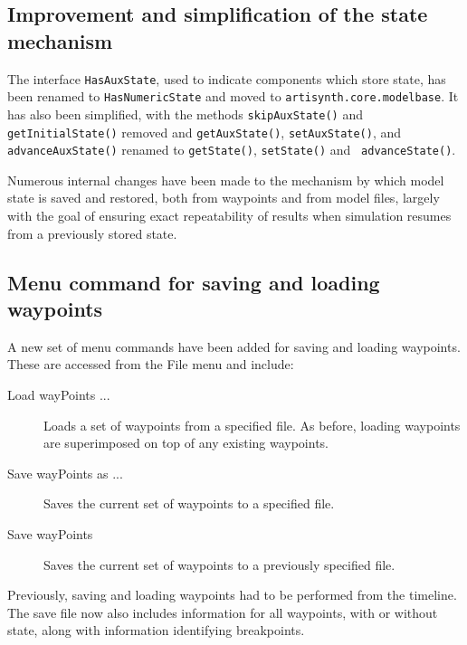 \documentclass{article}
\begin{document}
\subsection*{Improvement and simplification of the state mechanism}

The interface {\tt HasAuxState}, used to indicate components which
store state, has been renamed to {\tt HasNumericState} and moved to
{\tt artisynth.core.modelbase}. It has also been simplified, with the
methods {\tt skipAuxState()} and {\tt getInitialState()} removed and
{\tt getAuxState()}, {\tt setAuxState()}, and {\tt advanceAuxState()}
renamed to {\tt getState()}, {\tt setState()} and {\tt
advanceState()}.

Numerous internal changes have been made to the mechanism by which
model state is saved and restored, both from waypoints and from model
files, largely with the goal of ensuring exact repeatability of results
when simulation resumes from a previously stored state.

\subsection*{Menu command for saving and loading waypoints}

A new set of menu commands have been added for saving and loading
waypoints. These are accessed from the {\sf File} menu and include:

\begin{description}

\item[Load wayPoints ...]\mbox{}

Loads a set of waypoints from a specified file. As before, loading
waypoints are superimposed on top of any existing waypoints.

\item[Save wayPoints as ...]\mbox{}

Saves the current set of waypoints to a specified file.

\item[Save wayPoints]\mbox{}

Saves the current set of waypoints to a previously specified file.

\end{description}

Previously, saving and loading waypoints had to be performed from the
timeline. The save file now also includes information for all
waypoints, with or without state, along with information identifying
breakpoints.
\end{document}
